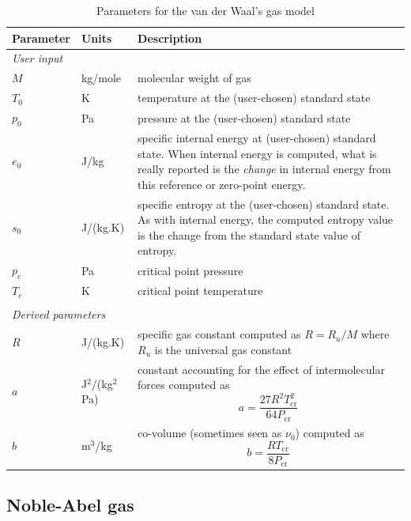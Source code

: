 \begin{table}[h!]
\caption{Parameters for the van der Waal's gas model}
\label{tab:vdw-params}
\begin{tabular}{llp{10cm}}
\toprule
Parameter & Units & Description \\ \midrule
\multicolumn{3}{l}{\textit{User input}} \\
$M$       & kg/mole & molecular weight of gas \\
$T_0$     & K      & temperature at the (user-chosen) standard state \\
$p_0$     & Pa     & pressure at the (user-chosen) standard state \\
$e_0$     & J/kg   & specific internal energy at (user-chosen) standard state.
                    When internal energy is computed, what is really 
                    reported is the \emph{change} in internal energy
                    from this reference or zero-point energy. \\
$s_0$     & J/(kg.K) & specific entropy at the (user-chosen) standard state.
                       As with internal energy, the computed entropy value
                       is the change from the standard state value of entropy. \\
$p_c$     & Pa     & critical point pressure \\
$T_c$     & K      & critical point temperature \\
 & & \\
\multicolumn{3}{l}{\textit{Derived parameters}} \\
$R$      & J/(kg.K) & specific gas constant computed as $R = R_u/M$ where
                      $R_u$ is the universal gas constant \\
$a$      & J$^2$/(kg$^2$Pa) & constant accounting for the effect of intermolecular forces
                              computed as \[ a = \frac{27 R^2 T^2_{\text{cr}}}{64 P_{\text{cr}}} \] \\
$b$      & m$^3$/kg & co-volume (sometimes seen as $\nu_0$) computed as
                      \[ b = \frac{R T_{\text{cr}}}{8 P_{\text{cr}}} \] \\

\bottomrule
\end{tabular}
\end{table}

\subsection{Noble-Abel gas}
\label{sec:noble_abel_gas}

